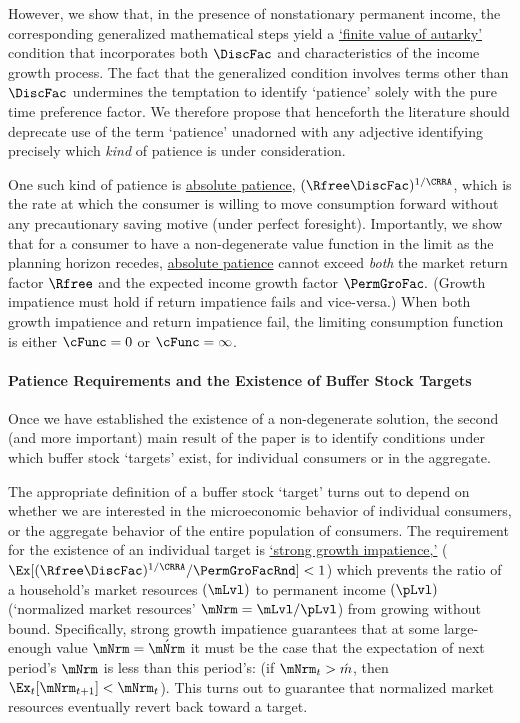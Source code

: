 \documentclass[BufferStockTheory]{subfiles}
\begin{document}
However, we show that, in the presence of nonstationary permanent income, the corresponding generalized mathematical steps yield a \hyperlink{FVAC}{`finite value of autarky'} condition that incorporates both $\DiscFac$ and characteristics of the income growth process. The fact that the generalized condition involves terms other than $\DiscFac$ undermines the temptation to identify `patience' solely with the pure time preference factor.  We therefore propose that henceforth the literature should deprecate use of the term `patience' unadorned with any adjective identifying precisely which \textit{kind} of patience is under consideration.



One such kind of patience is \hyperlink{APF}{absolute patience}, $\APFacRaw$, which is the rate at which the consumer is willing to move consumption forward without any precautionary saving motive (under perfect foresight). Importantly, we show that for a consumer to have a non-degenerate value function in the limit as the planning horizon recedes, \hyperlink{APF}{absolute patience} cannot exceed \textit{both} the market return factor $\Rfree$ and the expected income growth factor $\PermGroFac.$
(Growth impatience must hold if return impatience fails and vice-versa.)
When both growth impatience and return impatience fail, the limiting consumption function is either $\cFunc=0$ or $\cFunc=\infty$. 




\paragraph{Patience Requirements and the Existence of Buffer Stock Targets}

Once we have established the existence of a non-degenerate solution, the second (and more important) main result of the paper is to identify conditions under which buffer stock `targets' exist, for individual consumers or in the aggregate.

The appropriate definition of a buffer stock `target' turns out to depend on whether we are interested in the microeconomic behavior of individual consumers, or the aggregate behavior of the entire population of consumers.
The requirement for the existence of an individual target is \hyperlink{GICMod}{`strong growth impatience,'} ($\Ex[\APFacRaw/\PermGroFacRnd] < 1$) which prevents the ratio of a household's market resources $(\mLvl)$ to permanent income $(\pLvl)$ (`normalized market resources' $\mNrm = \mLvl/\pLvl$) from growing without bound.
Specifically, strong growth impatience guarantees that at some large-enough value $\mNrm = \acute{\mNrm}$ it must be the case that the expectation of next period's $\mNrm$ is less than this period's: (if $\mNrm_{t} > \acute{m}$, then $\Ex_{t}[\mNrm_{t+1}] < \mNrm_{t}$). 
This turns out to guarantee that normalized market resources eventually revert back toward a target.
\end{document}
